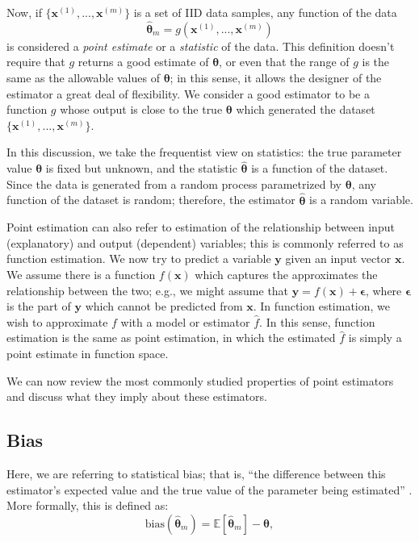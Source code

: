 Now, if $\{ \boldsymbol{x}^{(1)}, ..., \boldsymbol{x}^{(m)}\}$ is a set of \ac{IID} data samples, any function of the data
\begin{equation}
\boldsymbol{\hat\theta}_m = g(\boldsymbol{x}^{(1)}, ..., \boldsymbol{x}^{(m)})
\end{equation}
is considered a \textit{point estimate} or a \textit{statistic} of the data. This definition doesn't require that $g$ returns a good estimate of $\boldsymbol{\theta}$, or even that the range of $g$ is the same as the allowable values of $\boldsymbol{\theta}$; in this sense, it allows the designer of the estimator a great deal of flexibility. We consider a good estimator to be a function $g$ whose output is close to the true $\boldsymbol{\theta}$ which generated the dataset $\{ \boldsymbol{x}^{(1)}, ..., \boldsymbol{x}^{(m)} \}$.

In this discussion, we take the frequentist view on statistics: the true parameter value $\boldsymbol{\theta}$ is fixed but unknown, and the statistic $\boldsymbol{\hat\theta}$ is a function of the dataset. Since the data is generated from a random process parametrized by $\boldsymbol{\theta}$, any function of the dataset is random; therefore, the estimator $\boldsymbol{\hat\theta}$ is a random variable.

Point estimation can also refer to estimation of the relationship between input (explanatory) and output (dependent) variables; this is commonly referred to as function estimation. We now try to predict a variable $\boldsymbol{y}$ given an input vector $\boldsymbol{x}$. We assume there is a function $f(\boldsymbol{x})$ which captures the approximates the relationship between the two; e.g., we might assume that $\boldsymbol{y} = f(\boldsymbol{x}) + \boldsymbol{\epsilon}$, where $\boldsymbol{\epsilon}$ is the part of $\boldsymbol{y}$ which cannot be predicted from $\boldsymbol{x}$. In function estimation, we wish to approximate $f$ with a model or estimator $\hat f$. In this sense, function estimation is the same as point estimation, in which the estimated $\hat f$ is simply a point estimate in function space.

We can now review the most commonly studied properties of point estimators and discuss what they imply about these estimators.

\subsection{Bias}


Here, we are referring to statistical bias; that is, ``the difference between this estimator's expected value and the true value of the parameter being estimated'' \cite{wikipediaBiasofanestimator2019}. More formally, this is defined as:
\begin{equation}
\text{bias}(\boldsymbol{\hat\theta}_m) = \mathbb{E}[\boldsymbol{\hat\theta}_m] - \boldsymbol{\theta},
\end{equation}

